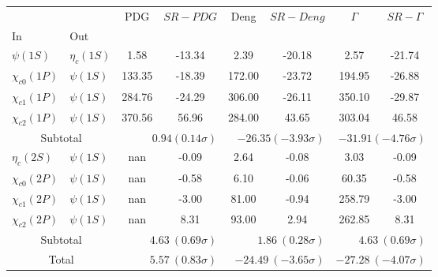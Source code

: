 \begin{tabular}{|l|l|c|c|c|c|c|c|}%
\hline%
&&PDG&$SR-PDG$&Deng&$SR-Deng$&$\Gamma$&$SR-\Gamma$\\%
In&Out&&&&&&\\%
\hline%
$\psi(1S)$&$\eta_{c}(1S)$&1.58&-13.34&2.39&-20.18&2.57&-21.74\\%
$\chi_{c0}(1P)$&$\psi(1S)$&133.35&-18.39&172.00&-23.72&194.95&-26.88\\%
$\chi_{c1}(1P)$&$\psi(1S)$&284.76&-24.29&306.00&-26.11&350.10&-29.87\\%
$\chi_{c2}(1P)$&$\psi(1S)$&370.56&56.96&284.00&43.65&303.04&46.58\\%
\hline%
\hline%
\multicolumn{2}{|c|}{Subtotal}&\multicolumn{2}{|r|}{$0.94 (0.14\sigma)$}&\multicolumn{2}{|r|}{$-26.35 (-3.93\sigma)$}&\multicolumn{2}{|r|}{$-31.91 (-4.76\sigma)$}\\%
\hline%
\hline%
$\eta_{c}(2S)$&$\psi(1S)$&nan&-0.09&2.64&-0.08&3.03&-0.09\\%
$\chi_{c0}(2P)$&$\psi(1S)$&nan&-0.58&6.10&-0.06&60.35&-0.58\\%
$\chi_{c1}(2P)$&$\psi(1S)$&nan&-3.00&81.00&-0.94&258.79&-3.00\\%
$\chi_{c2}(2P)$&$\psi(1S)$&nan&8.31&93.00&2.94&262.85&8.31\\%
\hline%
\hline%
\multicolumn{2}{|c|}{Subtotal}&\multicolumn{2}{|r|}{$4.63~(0.69\sigma)$}&\multicolumn{2}{|r|}{$1.86~(0.28\sigma)$}&\multicolumn{2}{|r|}{$4.63~(0.69\sigma)$}\\%
\hline%
\hline%
\multicolumn{2}{|c|}{Total}&\multicolumn{2}{|r|}{$5.57~(0.83\sigma)$}&\multicolumn{2}{|r|}{$-24.49~(-3.65\sigma)$}&\multicolumn{2}{|r|}{$-27.28~(-4.07\sigma)$}\\%
\hline%
\end{tabular}